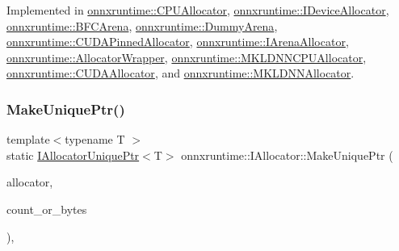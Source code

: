 Implemented in \mbox{\hyperlink{classonnxruntime_1_1CPUAllocator_a5eda291e0b728ea21d1f6893b5108020}{onnxruntime\+::\+C\+P\+U\+Allocator}}, \mbox{\hyperlink{classonnxruntime_1_1IDeviceAllocator_a46b848cd863bcd50d1e63d48ad96c63c}{onnxruntime\+::\+I\+Device\+Allocator}}, \mbox{\hyperlink{classonnxruntime_1_1BFCArena_acf4fc8182c636a16d62e80cf051da0e2}{onnxruntime\+::\+B\+F\+C\+Arena}}, \mbox{\hyperlink{classonnxruntime_1_1DummyArena_a7f85a06ef904b9fe007e76d18a8d68a9}{onnxruntime\+::\+Dummy\+Arena}}, \mbox{\hyperlink{classonnxruntime_1_1CUDAPinnedAllocator_af08d82e6f7b890059386326ac371950a}{onnxruntime\+::\+C\+U\+D\+A\+Pinned\+Allocator}}, \mbox{\hyperlink{classonnxruntime_1_1IArenaAllocator_a4eb52bb1236cf59aec91161156286ba0}{onnxruntime\+::\+I\+Arena\+Allocator}}, \mbox{\hyperlink{classonnxruntime_1_1AllocatorWrapper_a4eca2bcda00b9c970c3e8fd610d8f7b0}{onnxruntime\+::\+Allocator\+Wrapper}}, \mbox{\hyperlink{classonnxruntime_1_1MKLDNNCPUAllocator_ab5ed702febdae0ac4d7d6f17c3534cc7}{onnxruntime\+::\+M\+K\+L\+D\+N\+N\+C\+P\+U\+Allocator}}, \mbox{\hyperlink{classonnxruntime_1_1CUDAAllocator_a347f391c14e4466bce42915feefa1f2f}{onnxruntime\+::\+C\+U\+D\+A\+Allocator}}, and \mbox{\hyperlink{classonnxruntime_1_1MKLDNNAllocator_ad8e51ea2f30a5bf719c47b5d96de41c1}{onnxruntime\+::\+M\+K\+L\+D\+N\+N\+Allocator}}.

\mbox{\label{classonnxruntime_1_1IAllocator_aeca9cc0ec6d93a4be93884e69380e893}} 
\subsubsection{\texorpdfstring{Make\+Unique\+Ptr()}{MakeUniquePtr()}}
{\footnotesize\ttfamily template$<$typename T $>$ \\
static \mbox{\hyperlink{namespaceonnxruntime_a323aace024f171700e4b07b299a178e7}{I\+Allocator\+Unique\+Ptr}}$<$T$>$ onnxruntime\+::\+I\+Allocator\+::\+Make\+Unique\+Ptr (\begin{DoxyParamCaption}\item[{std\+::shared\+\_\+ptr$<$ \mbox{\hyperlink{classonnxruntime_1_1IAllocator}{I\+Allocator}} $>$}]{allocator,  }\item[{\mbox{\hyperlink{mlasi_8h_a503efbc1c6e50825320ad909366b78ab}{size\+\_\+t}}}]{count\+\_\+or\+\_\+bytes }\end{DoxyParamCaption})\hspace{0.3cm}{\ttfamily [inline]}, {\ttfamily [static]}}

